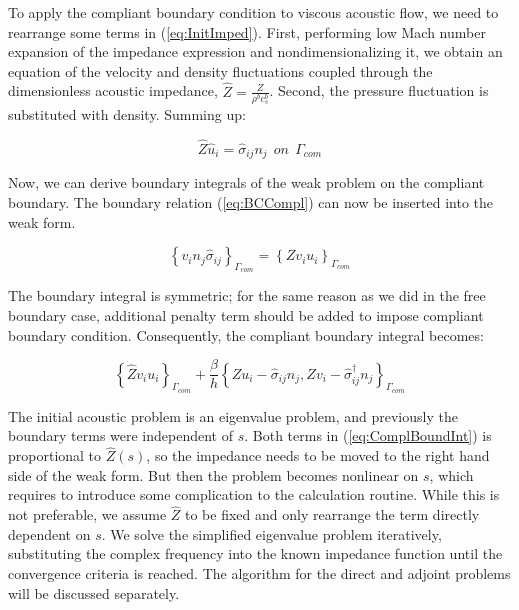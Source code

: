 To apply the compliant boundary condition to viscous acoustic flow, we need to rearrange some terms in (\ref{eq:InitImped}). First, performing low Mach number expansion of the impedance expression and nondimensionalizing it, we obtain an equation of the velocity and density fluctuations coupled through the dimensionless acoustic impedance, $\hat{Z} = \frac{Z}{\rho^b c_s^b}$. Second, the pressure fluctuation is substituted with density. Summing up:

\begin{equation}
\label{eq:BCCompl}
\hat{Z} \hat{u}_i= \hat{\sigma}_{ij} n_j  \ \ on \ \ \Gamma_{com}
\end{equation}

Now, we can derive boundary integrals of the weak problem on the compliant boundary. The boundary relation (\ref{eq:BCCompl}) can now be inserted into the weak form.

\begin{equation}
\left\{ v_i n_j \hat{\sigma}_{ij} \right\}_{\Gamma_{com}} = \left\{ Z v_i u_i \right\}_{\Gamma_{com}}
\end{equation}

The boundary integral is symmetric; for the same reason as we did in the free boundary case, additional penalty term should be added to impose compliant boundary condition. Consequently, the compliant boundary integral becomes:

\begin{equation}
\label{eq:ComplBoundInt}
\left\{\hat{Z} v_i u_i \right\}_{\Gamma_{com}} + \frac{\beta}{h} \left\{ Z u_i - \hat{\sigma}_{ij} n_j , Z v_i - \hat{\sigma}_{ij}^{\dagger} n_j \right\}_{\Gamma_{com}}
\end{equation}

The initial acoustic problem is an eigenvalue problem, and previously the boundary terms were independent of $s$. Both terms in (\ref{eq:ComplBoundInt}) is proportional to $\hat{Z}(s)$, so the impedance needs to be moved to the right hand side of the weak form. But then the problem becomes nonlinear on $s$, which requires to introduce some complication to the calculation routine. While this is not preferable, we assume $\hat{Z}$ to be fixed and only rearrange the term directly dependent on $s$. We solve the simplified eigenvalue problem iteratively, substituting the complex frequency into the known impedance function until the convergence criteria is reached. The algorithm for the direct and adjoint problems will be discussed separately.

